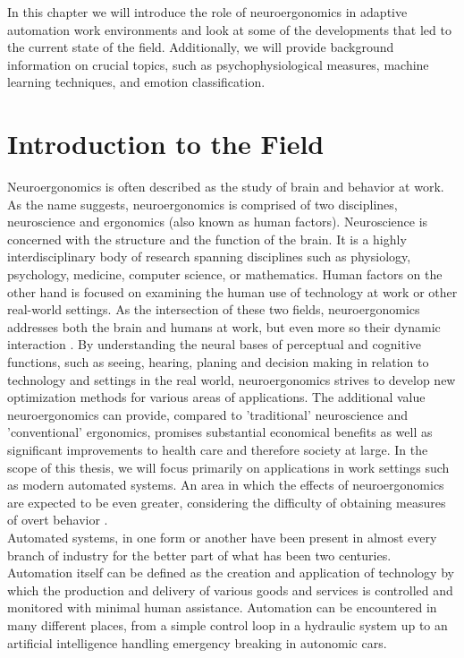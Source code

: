 
In this chapter we will introduce the role of neuroergonomics in adaptive automation work environments and look at some of the developments that led to the current state of the field. Additionally, we will provide background information on crucial topics, such as psychophysiological measures, machine learning techniques, and emotion classification.

\section{Introduction to the Field}
Neuroergonomics is often described as the study of brain and behavior at work. As the name suggests, neuroergonomics is comprised of two disciplines, neuroscience and ergonomics (also known as human factors). Neuroscience is concerned with the structure and the function of the brain. It is a highly interdisciplinary body of research spanning disciplines such as physiology, psychology, medicine, computer science, or mathematics. Human factors on the other hand is focused on examining the human use of technology at work or other real-world settings. As the intersection of these two fields, neuroergonomics addresses both the brain and humans at work, but even more so their dynamic interaction \cite{Parasuraman2003}
. By understanding the neural bases of perceptual and cognitive functions, such as seeing, hearing, planing and decision making in relation to technology and settings in the real world, neuroergonomics strives to develop new optimization methods for various areas of applications. The additional value neuroergonomics can provide, compared to 'traditional' neuroscience and 'conventional' ergonomics, promises substantial economical benefits as well as significant improvements to health care and therefore society at large. 
In the scope of this thesis, we will focus primarily on applications in work settings such as modern automated systems. An area in which the effects of neuroergonomics are expected to be even greater, considering the difficulty of obtaining measures of overt behavior \cite{Parasuraman2003}.\\
Automated systems, in one form or another have been present in almost every branch of industry for the better part of what has been two centuries. Automation itself can be defined as the creation and application of technology by which the production and delivery of various goods and services is controlled and monitored with minimal human assistance. Automation can be encountered in many different places, from a simple control loop in a hydraulic system up to an artificial intelligence handling emergency breaking in autonomic cars.
